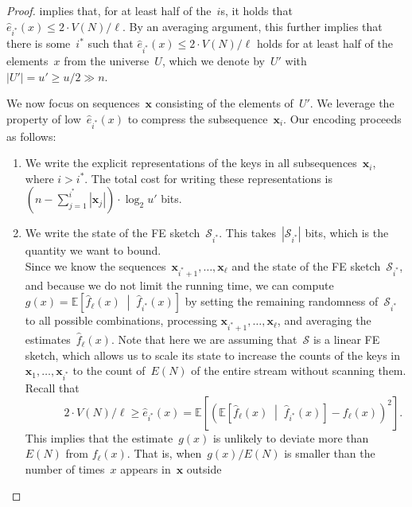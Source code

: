 \documentclass[sigconf]{acmart}
\begin{document}
\begin{proof}
     implies that, for at least half of the~$i$s, it
    holds that $\hat{e}_{i^*}(x) \leq 2 \cdot V(N)/\ell$. By an averaging
    argument, this further implies that there is some~$i^*$ such that
    $\hat{e}_{i^*}(x) \leq 2 \cdot V(N)/\ell$ holds for at least half of the
    elements~$x$ from the universe~$U$, which we denote by~$U'$ with $|U'| = u'
    \geq u/2 \gg n$. 

    We now focus on sequences~$\mathbf{x}$ consisting of the elements of~$U'$.
    We leverage the property of low~$\hat{e}_{i^*}(x)$ to compress the
    subsequence~$\mathbf{x}_i$. Our encoding proceeds as follows:
    \begin{enumerate}[label=(\roman*)]
        \item We write the explicit representations of the keys in all
            subsequences~$\mathbf{x}_i$, where $i > i^*$. The total cost for
            writing these representations is~$(n-\sum_{j=1}^{i^*}
            |\mathbf{x}_j|) \cdot \log_2 u'$ bits.
        \item We write the state of the FE sketch~$\mathcal{S}_{i^*}$. This
            takes~$|\mathcal{S}_{i^*}|$ bits, which is the quantity we want to
            bound. \\
            Since we know the sequences~$\mathbf{x}_{i^*+1}, \dots,
            \mathbf{x}_\ell$ and the state of the FE
            sketch~$\mathcal{S}_{i^*}$, and because we do not limit the running
            time, we can compute~$g(x)=\mathbb{E}\left[ \hat{f}_\ell(x)
            \;\middle|\; \hat{f}_{i^*}(x) \right]$ by setting the remaining
            randomness of~$\mathcal{S}_{i^*}$ to all possible combinations,
            processing $\mathbf{x}_{i^*+1}, \dots, \mathbf{x}_\ell$, and
            averaging the estimates~$\hat{f}_\ell(x)$. Note that here we are
            assuming that~$\mathcal{S}$ is a linear FE sketch, which allows us
            to scale its state to increase the counts of the keys
            in~$\mathbf{x}_1,\dots,\mathbf{x}_{i^*}$ to the count of~$E(N)$ of
            the entire stream without scanning them. Recall that 
            $$ \;\;\;\;\;\;\;\;\;\;\; 2 \cdot V(N)/\ell \geq \hat{e}_{i^*}(x) = \mathbb{E}\left[ \left( \mathbb{E}\left[ \hat{f}_\ell(x) \;\middle|\; \hat{f}_{i^*}(x) \right] - f_\ell(x) \right)^2 \right]. $$
            This implies that the estimate~$g(x)$ is unlikely to deviate more
            than~$E(N)$ from $f_\ell(x)$. That is, when~$g(x)/E(N)$ is smaller
            than the number of times~$x$ appears in~$\mathbf{x}$ outside

\end{enumerate}
\end{proof}
\end{document}
